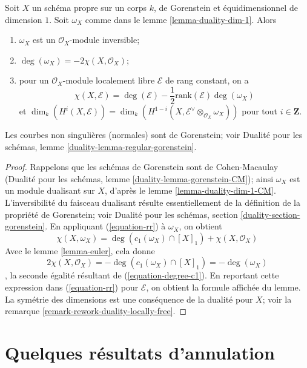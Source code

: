 \begin{lemma} \label{lemma-rr} Soit $X$ un schéma propre sur un corps $k$, de Gorenstein et équidimensionnel de dimension $1$. Soit $\omega_X$ comme dans le lemme \ref{lemma-duality-dim-1}. Alors \begin{enumerate} \item $\omega_X$ est un $\mathcal{O}_X$-module inversible; \item $\deg(\omega_X) = -2\chi(X, \mathcal{O}_X)$; \item pour un $\mathcal{O}_X$-module localement libre $\mathcal{E}$ de rang constant, on a $$
\chi(X, \mathcal{E}) = \deg(\mathcal{E}) -
\textstyle{\frac{1}{2}} \text{rank}(\mathcal{E}) \deg(\omega_X)
$$ et $\dim_k(H^i(X, \mathcal{E})) =
\dim_k(H^{1 - i}(X, \mathcal{E}^\vee \otimes_{\mathcal{O}_X} \omega_X))$ pour tout $i \in \mathbf{Z}$.
\end{enumerate}
\end{lemma}

\noindent
Les courbes non singulières (normales) sont de Gorenstein; voir Dualité pour les schémas, lemme \ref{duality-lemma-regular-gorenstein}.

\begin{proof}
Rappelons que les schémas de Gorenstein sont de Cohen-Macaulay (Dualité pour les schémas, lemme \ref{duality-lemma-gorenstein-CM}); ainsi $\omega_X$ est un module dualisant sur $X$, d'après le lemme \ref{lemma-duality-dim-1-CM}. L'inversibilité du faisceau dualisant résulte essentiellement de la définition de la propriété de Gorenstein; voir Dualité pour les schémas, section \ref{duality-section-gorenstein}. En appliquant (\ref{equation-rr}) à $\omega_X$, on obtient
$$
\chi(X, \omega_X) = 
\deg(c_1(\omega_X) \cap [X]_1) + \chi(X, \mathcal{O}_X)
$$ Avec le lemme \ref{lemma-euler}, cela donne $$
2\chi(X, \mathcal{O}_X) = - \deg(c_1(\omega_X) \cap [X]_1) = - \deg(\omega_X)
$$, la seconde égalité résultant de (\ref{equation-degree-c1}). En reportant cette expression dans (\ref{equation-rr}) pour $\mathcal{E}$, on obtient la formule affichée du lemme. La symétrie des dimensions est une conséquence de la dualité pour $X$; voir la remarque \ref{remark-rework-duality-locally-free}.
\end{proof}





\section{Quelques résultats d'annulation}
\label{section-vanishing}

